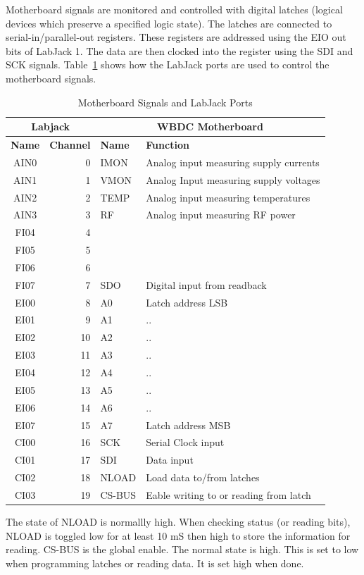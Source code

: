 \documentclass[letterpaper,11pt]{book}
\begin{document}
Motherboard signals are monitored and controlled with digital latches (logical
devices which preserve a specified logic state). The latches are connected to
serial-in/parallel-out registers.  These registers are addressed using the EIO
out bits of LabJack 1.  The data are then clocked into the register using
the SDI and SCK signals.  Table~\ref{tab:signals} shows how the LabJack ports 
are used to control the motherboard signals.
\begin{table}[h!tb]
  \begin{center}
    \caption{\label{tab:signals}Motherboard Signals and LabJack Ports}
    \begin{tabular}{|c|r|l|l|}
    \hline
    \multicolumn{2}{|c|}{\bf Labjack} & \multicolumn{2}{c|}{\bf WBDC Motherboard} \\
    \hline
     {\bf Name} & {\bf Channel} & {\bf Name}  & {\bf Function} \\
    \hline
      AIN0  &   0    & IMON &  Analog input measuring supply currents \\
      AIN1  &   1    & VMON &  Analog Input measuring supply voltages \\
      AIN2  &   2    & TEMP &  Analog input measuring temperatures \\
      AIN3  &   3    & RF   &  Analog input measuring RF power \\
      FI04  &   4    &      & \\
      FI05  &   5    &      & \\
      FI06  &   6    &      & \\
      FI07  &   7    & SDO  &  Digital input from readback \\
   \hline
      EI00  &   8    & A0   &      Latch address LSB \\
      EI01  &   9    & A1   &      .. \\
      EI02  &  10    & A2   &      .. \\
      EI03  &  11    & A3   &      .. \\
      EI04  &  12    & A4   &      .. \\
      EI05  &  13    & A5   &      .. \\
      EI06  &  14    & A6   &      .. \\
      EI07  &  15    & A7   &      Latch address MSB \\
    \hline
      CI00  &  16    & SCK     &   Serial Clock input \\
      CI01  &  17    & SDI     &   Data input \\
      CI02  &  18    & NLOAD   &   Load data to/from latches \\
      CI03  &  19    & CS-BUS  &   Eable writing to or reading from latch \\
    \hline  
    \end{tabular}
  \end{center}
\end{table}
The state of NLOAD is normallly high. When checking status (or reading bits),
NLOAD is toggled low for at least 10 mS then high to store the information for
reading.
CS-BUS is the global enable. The normal state is high. This is set to low when
programming latches or reading data. It is set high when done.
\end{document}
